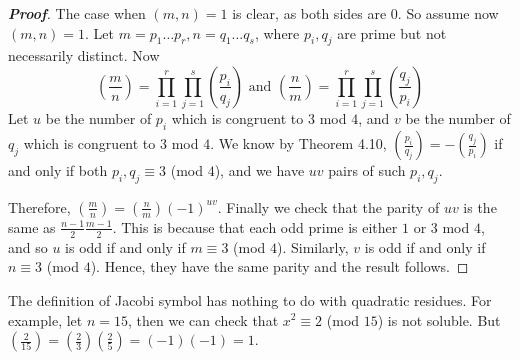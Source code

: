 \begin{proof}[\bf Proof] The case when $(m,n)=1$ is clear, as both sides are $0$. So assume now $(m,n)=1$.
Let $m=p_1 \ldots p_r,n=q_1 \ldots q_s$, where $p_i,q_j$ are prime but not necessarily distinct.
Now
$$\left(\frac{m}{n}\right)=\prod_{i=1}^{r} \prod_{j=1}^{s}\left(\frac{p_i}{q_j}\right)
\text{ and } \left(\frac{n}{m}\right)=\prod_{i=1}^{r} \prod_{j=1}^{s} \left(\frac{q_j}{p_i}\right)$$
Let $u$ be the number of $p_i$ which is congruent to $3$ mod $4$, and $v$ be the number of $q_j$ which is congruent to $3$ mod $4$. We know by Theorem 4.10, $(\frac{p_i}{q_j})=-(\frac{q_j}{p_i})$ if and only if both $p_i,q_j \equiv 3$ (mod $4$), and we have $uv$ pairs of such $p_i,q_j$.

Therefore, $(\frac{m}{n})=(\frac{n}{m})(-1)^{uv}$. Finally we check that the parity of $uv$ is the same as $\frac{n-1}{2}\frac{m-1}{2}$. This is because that each odd prime is either $1$ or $3$ mod $4$,
and so $u$ is odd if and only if $m \equiv 3$ (mod $4$). Similarly, $v$ is odd if and only if
$n \equiv 3$ (mod $4$). Hence, they have the same parity and the result follows.
\end{proof}
\begin{remark}
The definition of Jacobi symbol has nothing to do with quadratic residues. For example,
let $n=15$, then we can check that $x^2 \equiv 2$ (mod $15$) is not soluble. But
$(\frac{2}{15})=(\frac{2}{3})(\frac{2}{5})=(-1)(-1)=1$.
\end{remark}
